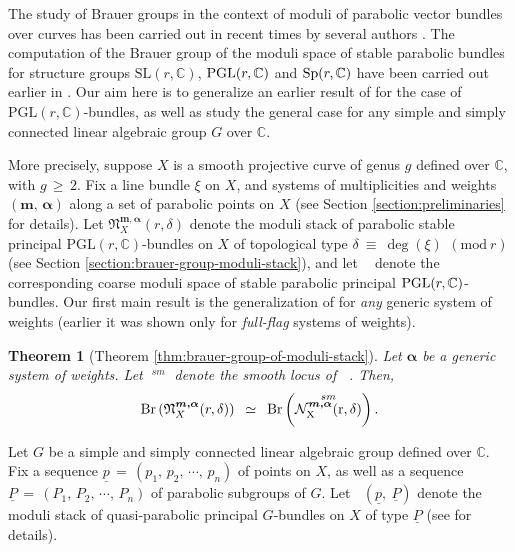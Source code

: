 \documentclass[10pt,reqno]{amsart}
\DeclareMathOperator{\Br}{\textnormal{Br}}
\DeclareMathOperator{\Nalpha}{\mc{N}^{\boldsymbol{m,\alpha}}_X(r,\delta)}
\DeclareMathOperator{\mgpar}{\mc{M}_G^{par}}
\newcommand{\mf}[1]{\mathfrak{#1}}
\newcommand{\mc}[1]{\mathcal{#1}}
\newcommand{\bb}[1]{\mathbb{#1}}
\newtheorem{theorem}{Theorem}[section]
\theoremstyle{myroman}
\numberwithin{equation}{section}
\begin{document}
	The study of Brauer groups in the context of moduli of parabolic vector bundles over curves has been carried 
	out in recent times by several authors \cite{BB23,BCD23,BCD24,BD11}. The computation of the Brauer group of 
	the moduli space of stable parabolic bundles for structure groups $\text{SL}(r,\bb{C})$, 
	$\textnormal{PGL}(r,\bb{C})$ and $\textnormal{Sp}(r,\bb{C})$ have been carried out earlier in \cite{BD11, 
		BCD23, BCD24}. Our aim here is to generalize an earlier result of \cite{BCD23} for the
	case of $\text{PGL}(r,\bb{C})$-bundles, as well as study the general case for any simple and simply
	connected linear algebraic group $G$ over $\bb{C}$.
	
	More precisely, suppose $X$ is a smooth projective curve of genus $g$ defined over $\bb{C}$, with $g
	\,\geq\, 2$. Fix a line 
	bundle $\xi$ on $X$, and systems of multiplicities and weights $(\boldsymbol{m,\,\alpha})$ along a set of 
	parabolic points on $X$ (see Section \ref{section:preliminaries} for details). Let 
	$\mf{N}_X^{\boldsymbol{m,\alpha}}(r,\delta)$ denote the moduli stack of parabolic stable principal
	$\text{PGL}(r,\bb{C})$-bundles on $X$ of topological type $\delta \ \equiv\ \deg(\xi)\ \,(\text{mod}\ r)$ (see 
	Section \ref{section:brauer-group-moduli-stack}), and let $\Nalpha$ denote the corresponding coarse moduli space 
	of stable parabolic principal $\textnormal{PGL}(r,\bb{C})$-bundles. Our first main result is the generalization of 
	\cite[Theorem 1.1 (1)]{BCD23} for \textit{any} generic system of weights (earlier it was shown only for 
	\textit{full-flag} systems of weights).
	
	\begin{theorem}[{Theorem \ref{thm:brauer-group-of-moduli-stack}}]
		Let $\boldsymbol{\alpha}$ be a generic system of weights. Let $\Nalpha^{sm}$ denote the smooth locus of $\Nalpha$. Then,
		$$\Br\left(\mf{N}^{\boldsymbol{m,\alpha}}_X(r,\delta)\right)\,\ \simeq\,\
		\Br\left(\Nalpha^{sm}\right).$$
	\end{theorem}
	
	Let $G$ be a simple and simply connected linear algebraic group
	defined over $\bb{C}$. Fix a sequence $\underline{p}\,=\, (p_1,\, p_2 ,\, \cdots,\, p_n)$ of points on $X$, as well
	as a sequence $\underline{P}\,=\,(P_1,\, P_2,\, \cdots,\, P_n)$ of parabolic subgroups of $G$. Let $\mgpar\left(\underline{p},\ \underline{P}\right)$ denote the moduli stack of quasi-parabolic principal $G$-bundles on $X$ of type $\underline{P}$ (see \cite{LS97} for details). 
	
\end{document}
